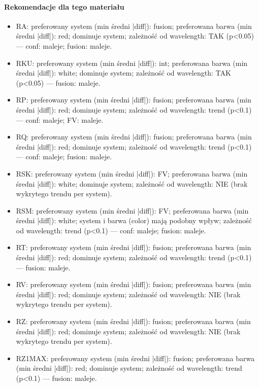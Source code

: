 \documentclass[
  10pt,
]{article}
\begin{document}
\paragraph{Rekomendacje dla tego materiału}
\begin{itemize}
\item RA: preferowany system (min średni |diff|): fusion; preferowana barwa (min średni |diff|): red; dominuje system; zależność od wavelength: TAK (p<0.05) — conf: maleje; fusion: maleje.
\item RKU: preferowany system (min średni |diff|): int; preferowana barwa (min średni |diff|): white; dominuje system; zależność od wavelength: TAK (p<0.05) — fusion: maleje.
\item RP: preferowany system (min średni |diff|): fusion; preferowana barwa (min średni |diff|): red; dominuje system; zależność od wavelength: trend (p<0.1) — conf: maleje; FV: maleje.
\item RQ: preferowany system (min średni |diff|): fusion; preferowana barwa (min średni |diff|): red; dominuje system; zależność od wavelength: trend (p<0.1) — conf: maleje; fusion: maleje.
\item RSK: preferowany system (min średni |diff|): FV; preferowana barwa (min średni |diff|): white; dominuje system; zależność od wavelength: NIE (brak wykrytego trendu per system).
\item RSM: preferowany system (min średni |diff|): FV; preferowana barwa (min średni |diff|): white; system i barwa (color) mają podobny wpływ; zależność od wavelength: trend (p<0.1) — conf: maleje; fusion: maleje.
\item RT: preferowany system (min średni |diff|): fusion; preferowana barwa (min średni |diff|): red; dominuje system; zależność od wavelength: trend (p<0.1) — fusion: maleje.
\item RV: preferowany system (min średni |diff|): fusion; preferowana barwa (min średni |diff|): red; dominuje system; zależność od wavelength: NIE (brak wykrytego trendu per system).
\item RZ: preferowany system (min średni |diff|): fusion; preferowana barwa (min średni |diff|): red; dominuje system; zależność od wavelength: NIE (brak wykrytego trendu per system).
\item RZ1MAX: preferowany system (min średni |diff|): fusion; preferowana barwa (min średni |diff|): red; dominuje system; zależność od wavelength: trend (p<0.1) — fusion: maleje.
\end{itemize}
\end{document}
